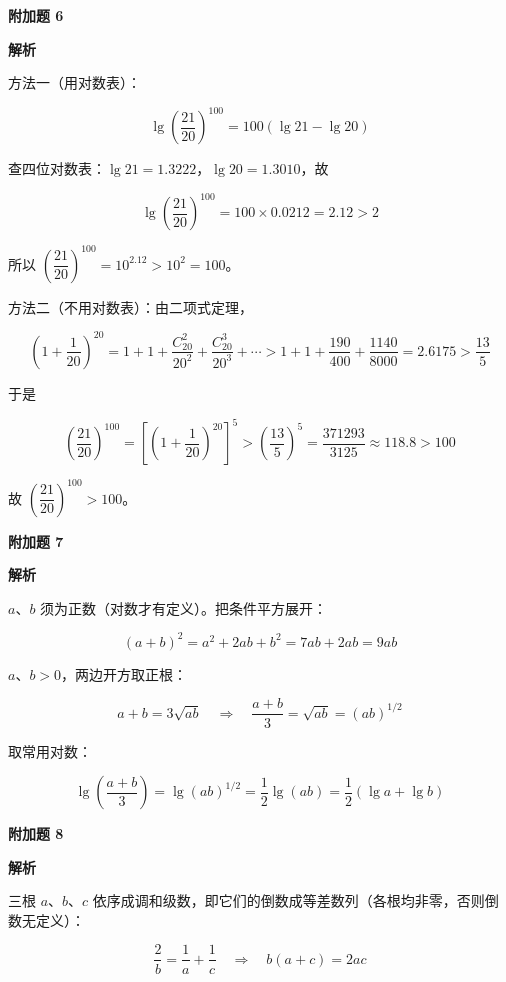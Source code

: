 \begin{answer}
\textbf{附加题 6}

\textbf{解析}

方法一（用对数表）：

\nopagebreak[4]
\[
\lg\left(\frac{21}{20}\right)^{100}=100(\lg 21-\lg 20)
\]

查四位对数表：$\lg 21=1.3222$，$\lg 20=1.3010$，故

\nopagebreak[4]
\[
\lg\left(\frac{21}{20}\right)^{100}=100\times0.0212=2.12>2
\]

所以 $\left(\dfrac{21}{20}\right)^{100}=10^{2.12}>10^2=100$。

方法二（不用对数表）：由二项式定理，

\nopagebreak[4]
\[
\left(1+\frac1{20}\right)^{20}
=1+1+\frac{C_{20}^2}{20^2}+\frac{C_{20}^3}{20^3}+\cdots
>1+1+\frac{190}{400}+\frac{1140}{8000}=2.6175>\frac{13}{5}
\]

于是

\nopagebreak[4]
\[
\left(\frac{21}{20}\right)^{100}
=\left[\left(1+\frac1{20}\right)^{20}\right]^5
>\left(\frac{13}{5}\right)^5=\frac{371293}{3125}\approx118.8>100
\]

故 $\left(\dfrac{21}{20}\right)^{100}>100$。

\textbf{附加题 7}

\textbf{解析}

$a$、$b$ 须为正数（对数才有定义）。把条件平方展开：

\nopagebreak[4]
\[
(a+b)^2=a^2+2ab+b^2=7ab+2ab=9ab
\]

$a$、$b>0$，两边开方取正根：

\nopagebreak[4]
\[
a+b=3\sqrt{ab}\quad\Longrightarrow\quad\frac{a+b}{3}=\sqrt{ab}=(ab)^{1/2}
\]

取常用对数：

\nopagebreak[4]
\[
\lg\left(\frac{a+b}{3}\right)=\lg(ab)^{1/2}=\frac12\lg(ab)=\frac12(\lg a+\lg b)
\]


\textbf{附加题 8}

\textbf{解析}

三根 $a$、$b$、$c$ 依序成调和级数，即它们的倒数成等差数列（各根均非零，否则倒数无定义）：

\nopagebreak[4]
\[
\frac2b=\frac1a+\frac1c\quad\Longrightarrow\quad b(a+c)=2ac
\]


\end{answer}
